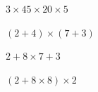 \begin{questions}
	
	
	\question[2]  $\num{3} \times 45 \times 20 \times \num{5} $
	\fillwithdottedlines{2cm}
	\begin{solution}
		
	\end{solution}





	
	
	\question[2]  $(2 + 4) \times (7 + 3) $
	\fillwithdottedlines{2cm}
	\begin{solution}
		
	\end{solution}
	
	\question[2]  $2 + 8 \times 7 + 3 $
	\fillwithdottedlines{2cm}
	\begin{solution}
		
	\end{solution}
	
	\question[2]  $(2 + 8 \times 8) \times 2 $
	\fillwithdottedlines{2cm}
	\begin{solution}
		
	\end{solution}
	
\end{questions}


